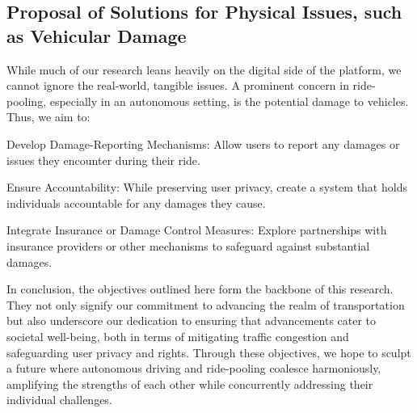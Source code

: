\subsection{Proposal of Solutions for Physical Issues, such as Vehicular Damage}

While much of our research leans heavily on the digital side of the platform, we cannot ignore the real-world, tangible issues. A prominent concern in ride-pooling, especially in an autonomous setting, is the potential damage to vehicles. Thus, we aim to:

Develop Damage-Reporting Mechanisms: Allow users to report any damages or issues they encounter during their ride.

Ensure Accountability: While preserving user privacy, create a system that holds individuals accountable for any damages they cause.

Integrate Insurance or Damage Control Measures: Explore partnerships with insurance providers or other mechanisms to safeguard against substantial damages.

In conclusion, the objectives outlined here form the backbone of this research. They not only signify our commitment to advancing the realm of transportation but also underscore our dedication to ensuring that advancements cater to societal well-being, both in terms of mitigating traffic congestion and safeguarding user privacy and rights. Through these objectives, we hope to sculpt a future where autonomous driving and ride-pooling coalesce harmoniously, amplifying the strengths of each other while concurrently addressing their individual challenges.